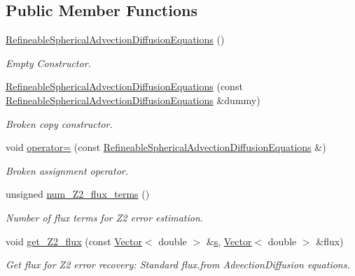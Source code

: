 \subsection*{Public Member Functions}
\begin{DoxyCompactItemize}
\item 
\hyperlink{classoomph_1_1RefineableSphericalAdvectionDiffusionEquations_a9138fe8eab86522fb1b9e5f4f3fcbe84}{Refineable\+Spherical\+Advection\+Diffusion\+Equations} ()
\begin{DoxyCompactList}\small\item\em Empty Constructor. \end{DoxyCompactList}\item 
\hyperlink{classoomph_1_1RefineableSphericalAdvectionDiffusionEquations_ab8317c0134459e7113b68b4e826b6633}{Refineable\+Spherical\+Advection\+Diffusion\+Equations} (const \hyperlink{classoomph_1_1RefineableSphericalAdvectionDiffusionEquations}{Refineable\+Spherical\+Advection\+Diffusion\+Equations} \&dummy)
\begin{DoxyCompactList}\small\item\em Broken copy constructor. \end{DoxyCompactList}\item 
void \hyperlink{classoomph_1_1RefineableSphericalAdvectionDiffusionEquations_a0b4c00d0e0e39dcfe22b2968523a78b0}{operator=} (const \hyperlink{classoomph_1_1RefineableSphericalAdvectionDiffusionEquations}{Refineable\+Spherical\+Advection\+Diffusion\+Equations} \&)
\begin{DoxyCompactList}\small\item\em Broken assignment operator. \end{DoxyCompactList}\item 
unsigned \hyperlink{classoomph_1_1RefineableSphericalAdvectionDiffusionEquations_ab9d53dc4a0842309fbb0a04c53f9575c}{num\+\_\+\+Z2\+\_\+flux\+\_\+terms} ()
\begin{DoxyCompactList}\small\item\em Number of \textquotesingle{}flux\textquotesingle{} terms for Z2 error estimation. \end{DoxyCompactList}\item 
void \hyperlink{classoomph_1_1RefineableSphericalAdvectionDiffusionEquations_ac43262d025548fc9063c58529bd1e33f}{get\+\_\+\+Z2\+\_\+flux} (const \hyperlink{classoomph_1_1Vector}{Vector}$<$ double $>$ \&\hyperlink{cfortran_8h_ab7123126e4885ef647dd9c6e3807a21c}{s}, \hyperlink{classoomph_1_1Vector}{Vector}$<$ double $>$ \&flux)
\begin{DoxyCompactList}\small\item\em Get \textquotesingle{}flux\textquotesingle{} for Z2 error recovery\+: Standard flux.\+from Advection\+Diffusion equations. \end{DoxyCompactList}\item 

\end{DoxyCompactItemize}
